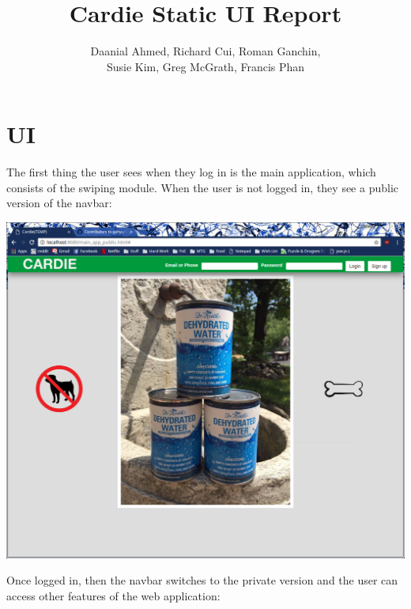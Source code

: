 \documentclass[10pt, titlepage]{article}
\begin{document}
\title{Cardie Static UI Report}

\author{Daanial Ahmed, Richard Cui, Roman Ganchin, \\Susie Kim, Greg McGrath, Francis Phan}

\maketitle

\section*{UI}
The first thing the user sees when they log in is the main application, which consists of the swiping module. When the user is not logged in, they see a public version of the navbar: \\

\centerline{\includegraphics[scale=.4]{screen_00}}

\pagebreak

\noindent Once logged in, then the navbar switches to the private version and the user can access other features of the web application: \\
\end{document}
